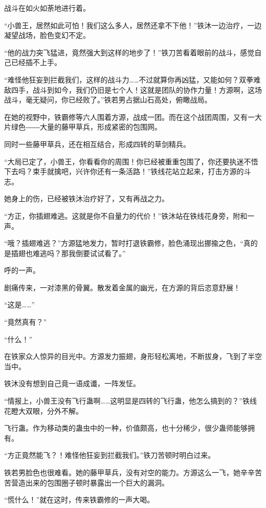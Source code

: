 
\begin{this_body}

战斗在如火如荼地进行着。

“小兽王，居然如此可怕！我们这么多人，居然还拿不下他！”铁沐一边治疗，一边凝望战场，脸色变幻不定。

“他的战力突飞猛进，竟然强大到这样的地步了！”铁刀苦看着眼前的战斗，感觉自己已经插不上手。

“难怪他狂妄到拦截我们，这样的战斗力……不过就算你再凶猛，又能如何？双拳难敌四手，战斗到如今，我们仍旧是七个人！这就是团队的协作力量！方源啊，这场战斗，毫无疑问，你已经败了。”铁若男占据山石高处，俯瞰战局。

在她的视野中，铁霸修等六人围着方源，战成一团。而在这个战团周围，又有一大片绿色――大量的藤甲草兵，形成紧密的包围网。

同时一些藤甲草兵，还在相互结合，形成四转的草剑精兵。

“大局已定了，小兽王，你看看你的周围！你已经被重重包围了，你还要执迷不悟下去吗？束手就擒吧，兴许你还有一条活路！”铁线花站立起来，打击方源的斗志。

她身上的伤，已经被铁沐治疗好了，又有再战之力。

“方正，你插翅难逃。这就是你不自量力的代价！”铁沐站在铁线花身旁，附和一声。

“哦？插翅难逃？”方源猛地发力，暂时打退铁霸修，脸色涌现出挪揄之色，“真的是插翅也难逃吗？那我倒要试试看了。”

呼的一声。

剧痛传来，一对漆黑的骨翼。散发着金属的幽光，在方源的背后恣意舒展！

“这是……”

“竟然真有？”

“什么！”

在铁家众人惊异的目光中。方源发力振翅，身形轻松离地，不断拔身，飞到了半空当中。

铁沐没有想到自己竟一语成谶，一阵发怔。

“情报上，小兽王没有飞行蛊啊……这明显是四转的飞行蛊，他怎么搞到的？”铁线花瞪大双眼，分外不解。

飞行蛊。作为移动类的蛊虫中的一种，价值颇高，也十分稀少，很少蛊师能够拥有。

“方正竟然能飞？！难怪他狂妄到拦截我们。”铁刀苦顿时明白过来。

铁若男脸色也很难看。她的藤甲草兵，没有对空的能力。方源这么一飞，她辛辛苦苦营造出来的包围圈子顿时暴露出一个巨大的漏洞。

“慌什么！”就在这时，传来铁霸修的一声大喝。


\end{this_body}
